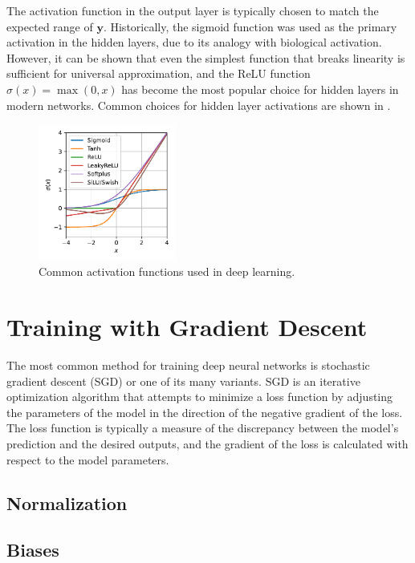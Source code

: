 The activation function in the output layer is typically chosen to match the expected range of $\mathbf{y}$.
Historically, the sigmoid function was used as the primary activation in the hidden layers, due to its analogy with biological activation.
However, it can be shown that even the simplest function that breaks linearity is sufficient for universal approximation, and the ReLU function $\sigma(x) = \max(0, x)$ has become the most popular choice for hidden layers in modern networks.
Common choices for hidden layer activations are shown in .

\begin{figure}
    \centering
    \includegraphics[width=0.4\textwidth]{Figures/transformers/activations.pdf}
    \caption{Common activation functions used in deep learning.}
    \label{fig:activations}
\end{figure}

\section{Training with Gradient Descent}

The most common method for training deep neural networks is stochastic gradient descent (SGD) or one of its many variants.
SGD is an iterative optimization algorithm that attempts to minimize a loss function by adjusting the parameters of the model in the direction of the negative gradient of the loss.
The loss function is typically a measure of the discrepancy between the model's prediction and the desired outputs, and the gradient of the loss is calculated with respect to the model parameters.

\subsection{Normalization}

\subsection{Biases}


